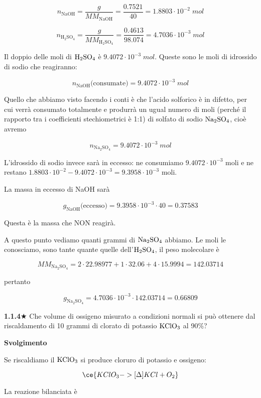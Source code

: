 $$n_{\text{NaOH}}=\frac{g}{MM_{\text{NaOH}}}=\frac{0.7521}{40}=1.8803 \cdot 10^{-2}\;mol$$

$$n_{\text{H}_2\text{SO}_4}=\frac{g}{MM_{\text{H}_2\text{SO}_4}}=\frac{0.4613}{98.074}=4.7036 \cdot 10^{-3}\;mol$$

Il doppio delle moli di $\rm H_2SO_4$ è $9.4072 \cdot 10^{-3}\;mol$. Queste sono le moli di idrossido di sodio che reagiranno:

$$n_{\text{NaOH}}\text{(consumate)}=9.4072 \cdot 10^{-3}\;mol$$

Quello che abbiamo visto facendo i conti è che l'acido solforico è in difetto, per cui verrà consumato totalmente e produrrà un ugual numero di moli (perché il rapporto tra i coefficienti stechiometrici è 1:1) di solfato di sodio $\rm Na_2SO_4$, cioè avremo

$$n_{\text{Na}_2\text{SO}_4}=9.4072 \cdot 10^{-3}\;mol$$

L'idrossido di sodio invece sarà in eccesso: ne consumiamo $9.4072 \cdot 10^{-3}$ moli e ne restano $1.8803 \cdot 10^{-2} - 9.4072 \cdot 10^{-3}=9.3958 \cdot 10^{-3}$ moli.

La massa in eccesso di NaOH sarà

$$g_{\text{NaOH}}\text{(eccesso)}=9.3958 \cdot 10^{-3} \cdot 40=0.37583$$

Questa è la massa che NON reagirà.

A questo punto vediamo quanti grammi di $\rm Na_2SO_4$ abbiamo. Le moli le conosciamo, sono tante quante quelle dell'$\rm H_2SO_4$, il peso molecolare è

$$MM_{\text{Na}_2\text{SO}_4}=2\cdot22.98977 + 1 \cdot 32.06 + 4 \cdot 15.9994=142.03714$$

pertanto

$$g_{\text{Na}_2\text{SO}_4}
=4.7036 \cdot 10^{-3} \cdot 142.03714
=0.66809$$

\vspace{0.2cm}\textbf{1.1.4}$\bigstar$ Che volume di ossigeno misurato a condizioni normali si può ottenere dal riscaldamento di 10 grammi di clorato di potassio $\rm KClO_3$ al 90\%?

\vspace{0.2cm}\large\textbf{Svolgimento}\normalsize

\vspace{0.2cm}Se riscaldiamo il $\rm KClO_3$ si produce cloruro di potassio e ossigeno:

$$\ce{KClO_3 ->[{\Delta}] KCl + O_2}$$

La reazione bilanciata è


